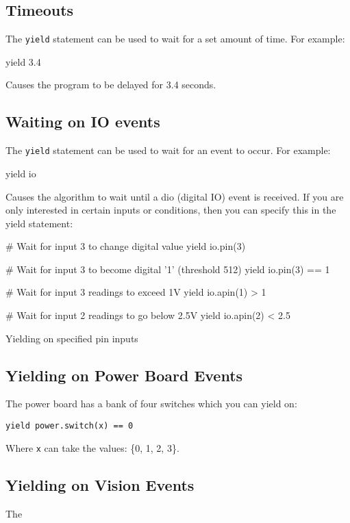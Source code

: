 \documentclass[a4paper, 12pt]{article}
\begin{document}
\subsection{Timeouts}
The \texttt{yield} statement can be used to wait for a set amount of
time.  For example:

\begin{verbatimtab}
yield 3.4
\end{verbatimtab}

Causes the program to be delayed for 3.4 seconds.

\subsection{Waiting on IO events}
The \texttt{yield} statement can be used to wait for an event to
occur.  For example:

\begin{verbatimtab}
yield io
\end{verbatimtab}

Causes the algorithm to wait until a dio (digital IO) event is received. If you are only interested in certain inputs or conditions, then you can specify this in the yield statement:
\begin{python}
\begin{verbatimtab}
# Wait for input 3 to change digital value
yield io.pin(3)
        
# Wait for input 3 to become digital '1' (threshold 512)
yield io.pin(3) == 1
        
# Wait for input 3 readings to exceed 1V
yield io.apin(1) > 1
        
# Wait for input 2 readings to go below 2.5V
yield io.apin(2) < 2.5
\end{verbatimtab} 
\caption{\label{py:yieldio}Yielding on specified pin inputs}
\end{python}


\subsection{Yielding on Power Board Events}
The power board has a bank of four switches which you can yield on:
\begin{verbatim}
yield power.switch(x) == 0
\end{verbatim}
Where \texttt{x} can take the values: \{0, 1, 2, 3\}.


\subsection{Yielding on Vision Events}
The 
\end{document}
